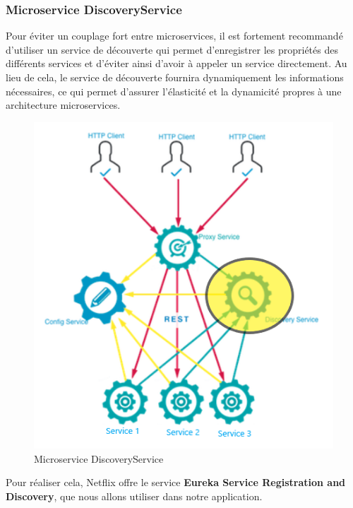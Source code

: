     \subsubsection{Microservice DiscoveryService}
Pour éviter un couplage fort entre microservices, il est fortement recommandé d'utiliser un service de découverte qui permet d'enregistrer les propriétés des différents services et d'éviter ainsi d'avoir à appeler un service directement. Au lieu de cela, le service de découverte fournira dynamiquement les informations nécessaires, ce qui permet d'assurer l'élasticité et la dynamicité propres à une architecture microservices.
\begin{figure}[H]
	\centering
	\includegraphics[width=0.5\linewidth]{images/tp04}
	\caption{Microservice DiscoveryService}
	\label{fig:tp04}
\end{figure}
    
    Pour réaliser cela, Netflix offre le service \textbf{Eureka Service Registration and Discovery}, que nous allons utiliser dans notre application.
    

